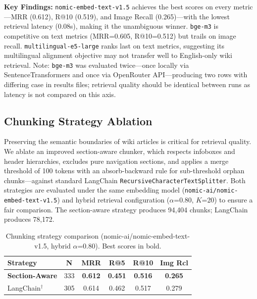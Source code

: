 \documentclass[11pt,a4paper]{article}
\begin{document}
\textbf{Key Findings:} \texttt{nomic-embed-text-v1.5} achieves the best scores on every metric---MRR (0.612), R@10 (0.519), and Image Recall (0.265)---with the lowest retrieval latency (0.08s), making it the unambiguous winner. \texttt{bge-m3} is competitive on text metrics (MRR=0.605, R@10=0.512) but trails on image recall. \texttt{multilingual-e5-large} ranks last on text metrics, suggesting its multilingual alignment objective may not transfer well to English-only wiki retrieval. Note: \texttt{bge-m3} was evaluated twice---once locally via SentenceTransformers and once via OpenRouter API---producing two rows with differing case in results files; retrieval quality should be identical between runs as latency is not compared on this axis.


\subsection{Chunking Strategy Ablation}
\label{sec:chunking-axis}

Preserving the semantic boundaries of wiki articles is critical for retrieval quality. We ablate an improved section-aware chunker, which respects infoboxes and header hierarchies, excludes pure navigation sections, and applies a merge threshold of 100 tokens with an absorb-backward rule for sub-threshold orphan chunks---against standard LangChain \texttt{RecursiveCharacterTextSplitter}. Both strategies are evaluated under the same embedding model (\texttt{nomic-ai/nomic-embed-text-v1.5}) and hybrid retrieval configuration ($\alpha$=0.80, $K$=20) to ensure a fair comparison. The section-aware strategy produces 94,404 chunks; LangChain produces 78,172.

\begin{table}[h]
\caption{Chunking strategy comparison (nomic-ai/nomic-embed-text-v1.5, hybrid $\alpha$=0.80). Best scores in bold.}
\label{tab:chunking}

\centering
\begin{tabular}{lccccc}
\toprule
\textbf{Strategy} & \textbf{N} & \textbf{MRR} & \textbf{R@5} & \textbf{R@10} & \textbf{Img Rcl} \\
\midrule
\textbf{Section-Aware} & 333 & \textbf{0.612} & \textbf{0.451} & \textbf{0.516} & \textbf{0.265} \\
LangChain$^\dagger$ & 305 & 0.614 & 0.462 & 0.517 & 0.279 \\
\bottomrule
\end{tabular}
\smallskip\par{}
\end{table}
\end{document}
